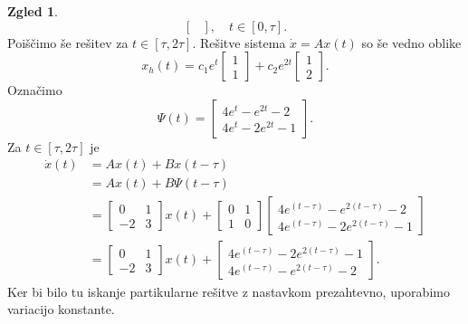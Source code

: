 \documentclass[12pt,a4paper]{amsart}
\theoremstyle{definition} %
\newtheorem{zgled}[definicija]{Zgled}
\theoremstyle{plain} %
\begin{document}
\begin{zgled}
\[\begin{bmatrix}
    \end{bmatrix}, \quad t\in[0,\tau].\]
    Poiščimo še rešitev za $t\in[\tau,2\tau]$. Rešitve sistema $\dot{x}=Ax(t)$ so še vedno oblike
    \[ x_h(t)=c_1e^t\begin{bmatrix}
        1 \\
        1 
    \end{bmatrix}
    +c_2e^{2t}\begin{bmatrix}
        1 \\
        2 
    \end{bmatrix}.\]
    Označimo
    \[\Psi(t)=\begin{bmatrix}
        4e^{t}-e^{2t}-2  \\
        4e^{t}-2e^{2t}-1  
    \end{bmatrix}.\]
    Za $t\in[\tau,2\tau]$ je
    \begin{equation*}
        \begin{split}
            \dot{x}(t) &= Ax(t)+Bx(t-\tau) \\
            &= Ax(t)+B\Psi(t-\tau) \\
            &= \begin{bmatrix}
                0 & 1 \\
                -2 & 3 
            \end{bmatrix}x(t)+\begin{bmatrix}
                0 & 1 \\
                1 & 0 
            \end{bmatrix}
            \begin{bmatrix}
                4e^{(t-\tau)}-e^{2(t-\tau)}-2  \\
                4e^{(t-\tau)}-2e^{2(t-\tau)}-1  
            \end{bmatrix} \\
            &= \begin{bmatrix}
                0 & 1 \\
                -2 & 3 
            \end{bmatrix}x(t)+
            \begin{bmatrix}
                4e^{(t-\tau)}-2e^{2(t-\tau)}-1  \\
                4e^{(t-\tau)}-e^{2(t-\tau)}-2  
            \end{bmatrix}.
        \end{split}
    \end{equation*}
    Ker bi bilo tu iskanje partikularne rešitve z nastavkom prezahtevno, uporabimo variacijo konstante.

\end{zgled}
\end{document}
